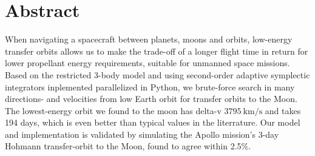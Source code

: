 \chapter{Abstract}
When navigating a spacecraft between planets, moons and orbits, low-energy transfer orbits allows us to make the trade-off of a longer flight time in return for lower propellant energy requirements, suitable for unmanned space missions. Based on the restricted 3-body model and using second-order adaptive symplectic integrators inplemented parallelized in Python, we brute-force search in many directions- and velocities from low Earth orbit for transfer orbits to the Moon. The lowest-energy orbit we found to the moon has delta-v $\SI{3795}{\km\per\s}$ and takes 194 days, which is even better than typical values in the literrature. Our model and implementation is validated by simulating the Apollo mission's 3-day Hohmann transfer-orbit to the Moon, found to agree within 2.5\%.